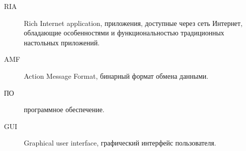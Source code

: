 \Abbreviations %
\begin{description}
\item[RIA] Rich Internet application, приложения, доступные через сеть Интернет, обладающие особенностями и
функциональностью традиционных настольных приложений.
\item[AMF] Action Message Format, бинарный формат обмена данными.
\item[ПО] программное обеспечение.
\item[GUI] Graphical user interface, графический интерфейс пользователя.
\end{description}
